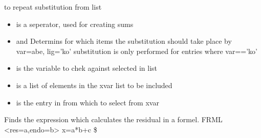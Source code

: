 \documentclass[letterpaper,10pt,english]{sphinxmanual}
\begin{document}
\begin{fulllineitems}
\label{\detokenize{onboard/modelmanipulation:modelmanipulation.sub_frml}}
\pysigstartsignatures
{}
\pysigstopsignatures
\sphinxAtStartPar
to repeat substitution from list
\begin{itemize}
\item {} 
\sphinxAtStartPar
{} is a seperator, used for creating sums

\item {} 
\sphinxAtStartPar
{} and  Determins for which items the substitution should take place
by var=abe, lig=’ko’ substitution is only performed for entries where var==’ko’

\item {} 
\sphinxAtStartPar
{} is the variable to chek against selected in list

\item {} 
\sphinxAtStartPar
{} is a list of elements in the xvar list to be included

\item {} 
\sphinxAtStartPar
{} is the entry in  from which to select from xvar

\end{itemize}

\end{fulllineitems}


\begin{fulllineitems}
\label{\detokenize{onboard/modelmanipulation:modelmanipulation.find_res}}
\pysigstartsignatures
{}
\pysigstopsignatures
\sphinxAtStartPar
Finds the expression which calculates the residual in a formel. FRML \textless{}res=a,endo=b\textgreater{} x=a*b+c \$

\end{fulllineitems}
\end{document}

